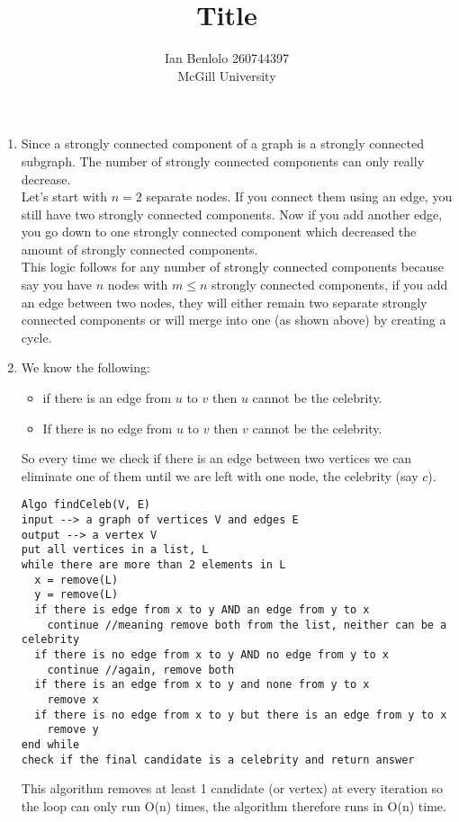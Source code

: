 
\usepackage{cancel}
\title{Title}

\usepackage{color,soul}
\usepackage{amsmath}
\newenvironment{tightcenter}{%
  \setlength\topsep{0pt}
  \setlength\parskip{0pt}
  \begin{center}
}{%
  \end{center}
}
\usepackage{enumerate}
\author{Ian Benlolo 260744397\\McGill University\\}

\maketitle
\begin{enumerate}[1.]

\item Since a strongly connected component of a graph is a strongly connected subgraph. The number of strongly connected components can only really decrease.\\
Let's start with $n=2$ separate nodes. If you connect them using an edge, you still have two strongly connected components. Now if you add another edge, you go down to one strongly connected component which decreased the amount of strongly connected components. \\
This logic follows for any number of strongly connected components because say you have $n$ nodes with $m \leq n $ strongly connected components, if you add an edge between two nodes, they will either remain two separate strongly connected components or will merge into one (as shown above) by creating a cycle. 

\item We know the following: 
	\begin{itemize}
		\item if there is an edge from $u$ to $v$ then $u$ cannot be the celebrity.
		\item If there is no edge from $u$ to $v$ then $v$ cannot be the celebrity. 
	\end{itemize}
So every time we check if there is an edge between two vertices we can eliminate one of them until we are left with one node, the celebrity (say $c$). 
\begin{verbatim}Algo findCeleb(V, E)
input --> a graph of vertices V and edges E 
output --> a vertex V
put all vertices in a list, L
while there are more than 2 elements in L
  x = remove(L)
  y = remove(L)
  if there is edge from x to y AND an edge from y to x
    continue //meaning remove both from the list, neither can be a celebrity
  if there is no edge from x to y AND no edge from y to x
    continue //again, remove both
  if there is an edge from x to y and none from y to x
    remove x  
  if there is no edge from x to y but there is an edge from y to x
    remove y
end while
check if the final candidate is a celebrity and return answer
\end{verbatim}
This algorithm removes at least 1 candidate (or vertex) at every iteration so the loop can only run O(n) times, the algorithm therefore runs in O(n) time. 
 

\end{enumerate}
